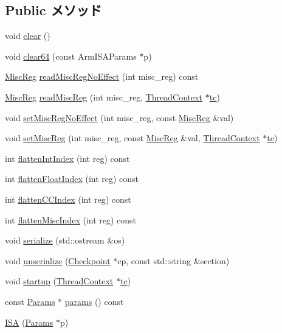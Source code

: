 \subsection*{Public メソッド}
\begin{DoxyCompactItemize}
\item 
void \hyperlink{structArmISA_1_1ISA_ac8bb3912a3ce86b15842e79d0b421204}{clear} ()
\item 
void \hyperlink{structArmISA_1_1ISA_acfe5434ce5ff7f87e2ce263d3ac51c24}{clear64} (const ArmISAParams $\ast$p)
\item 
\hyperlink{namespaceArmISA_aa16539aa6584fd12f7d6fa868f75b4de}{MiscReg} \hyperlink{structArmISA_1_1ISA_a17649252f355bfda86ea00dd728d8c02}{readMiscRegNoEffect} (int misc\_\-reg) const 
\item 
\hyperlink{namespaceArmISA_aa16539aa6584fd12f7d6fa868f75b4de}{MiscReg} \hyperlink{structArmISA_1_1ISA_a5e47db3953e6f623b58fee4f22a406bd}{readMiscReg} (int misc\_\-reg, \hyperlink{classThreadContext}{ThreadContext} $\ast$\hyperlink{namespaceArmISA_a5aff829af55e65b802d83dfcef4e9dd0}{tc})
\item 
void \hyperlink{structArmISA_1_1ISA_a763517aaea2f3decbc1ef9d064216b6f}{setMiscRegNoEffect} (int misc\_\-reg, const \hyperlink{namespaceArmISA_aa16539aa6584fd12f7d6fa868f75b4de}{MiscReg} \&val)
\item 
void \hyperlink{structArmISA_1_1ISA_ae4d63c6d4ee4354d39674ff8c53d9e2f}{setMiscReg} (int misc\_\-reg, const \hyperlink{namespaceArmISA_aa16539aa6584fd12f7d6fa868f75b4de}{MiscReg} \&val, \hyperlink{classThreadContext}{ThreadContext} $\ast$\hyperlink{namespaceArmISA_a5aff829af55e65b802d83dfcef4e9dd0}{tc})
\item 
int \hyperlink{structArmISA_1_1ISA_aece4b88ffcab608652e8e9f0fbe643d4}{flattenIntIndex} (int reg) const 
\item 
int \hyperlink{structArmISA_1_1ISA_a85addcd4f57c5a0ffa81805dcad1eeb7}{flattenFloatIndex} (int reg) const 
\item 
int \hyperlink{structArmISA_1_1ISA_a7a5d7476bd10e5af09e6e753d1fca087}{flattenCCIndex} (int reg) const 
\item 
int \hyperlink{structArmISA_1_1ISA_a8997760aa4425793911f57440a4dd8ae}{flattenMiscIndex} (int reg) const 
\item 
void \hyperlink{structArmISA_1_1ISA_a53e036786d17361be4c7320d39c99b84}{serialize} (std::ostream \&os)
\item 
void \hyperlink{structArmISA_1_1ISA_af22e5d6d660b97db37003ac61ac4ee49}{unserialize} (\hyperlink{classCheckpoint}{Checkpoint} $\ast$cp, const std::string \&section)
\item 
void \hyperlink{structArmISA_1_1ISA_a769e733729615c529fdb54f538f11dba}{startup} (\hyperlink{classThreadContext}{ThreadContext} $\ast$\hyperlink{namespaceArmISA_a5aff829af55e65b802d83dfcef4e9dd0}{tc})
\item 
const \hyperlink{structArmISA_1_1ISA_a44000e19d886af0a346cd5a03302d3b6}{Params} $\ast$ \hyperlink{structArmISA_1_1ISA_acd3c3feb78ae7a8f88fe0f110a718dff}{params} () const 
\item 
\hyperlink{structArmISA_1_1ISA_ae9132e021b3f3b20c917fc328a056bbd}{ISA} (\hyperlink{structArmISA_1_1ISA_a44000e19d886af0a346cd5a03302d3b6}{Params} $\ast$p)
\end{DoxyCompactItemize}
